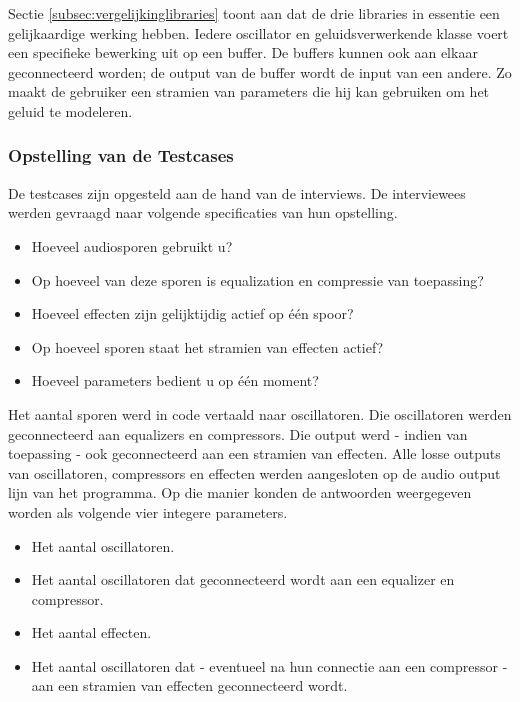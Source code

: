 Sectie \ref{subsec:vergelijkinglibraries} toont aan dat de drie libraries in essentie een gelijkaardige werking hebben. Iedere oscillator en geluidsverwerkende klasse voert een specifieke bewerking uit op een buffer. De buffers kunnen ook aan elkaar geconnecteerd worden; de output van de buffer wordt de input van een andere. Zo maakt de gebruiker een stramien van parameters die hij kan gebruiken om het geluid te modeleren.

\subsubsection{Opstelling van de Testcases}

De testcases zijn opgesteld aan de hand van de interviews. De interviewees werden gevraagd naar volgende specificaties van hun opstelling. 

\begin{itemize}
	\item Hoeveel audiosporen gebruikt u?
	\item Op hoeveel van deze sporen is equalization en compressie van toepassing?
	\item Hoeveel effecten zijn gelijktijdig actief op één spoor?
	\item Op hoeveel sporen staat  het stramien van effecten actief?
	\item Hoeveel parameters bedient u op één moment?
\end{itemize}

Het aantal sporen werd in code vertaald naar oscillatoren. Die oscillatoren werden geconnecteerd aan equalizers en compressors. Die output werd - indien van toepassing - ook geconnecteerd aan een stramien van effecten. Alle losse outputs van oscillatoren, compressors en effecten werden aangesloten op de audio output lijn van het programma. Op die manier konden de antwoorden weergegeven worden als volgende vier integere parameters.

\begin{itemize}
	\item Het aantal oscillatoren.
	\item Het aantal oscillatoren dat geconnecteerd wordt aan een equalizer en compressor.
	\item Het aantal effecten.
	\item Het aantal oscillatoren dat - eventueel na hun connectie aan een compressor - aan een stramien van effecten geconnecteerd wordt.
\end{itemize}

